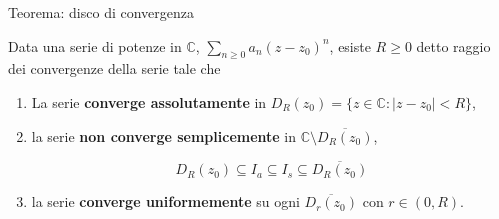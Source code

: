 \documentclass[x11names]{article}
\newcommand{\teorema}[2]{
	\begin{center}
		\fboxsep11pt
		\colorbox{myred}{\begin{minipage}{5.75in}
				\begin{redes}{#1}
					#2
				\end{redes}
		\end{minipage}}
	\end{center}
}
\begin{document}
\teorema{Teorema: disco di convergenza}{
Data una serie di potenze in \(\mathbb{C}\), \(\sum_{n\geq 0} a_{n}(z- z_{0})^n\), esiste \(R\geq 0\) detto raggio dei convergenze della serie tale che
\begin{enumerate}
	\item La serie \textbf{converge assolutamente} in \(D_{R}(z_{0}) = \{z\in \mathbb{C} : |z-z_{0}| < R\}\),
	\item la serie \textbf{non converge semplicemente} in \(\mathbb{C} \setminus \overline{D_{R}(z_{0})}\),
	
	\[ 
	D_{R}(z_{0}) \subseteq I_{a} \subseteq I_{s} \subseteq \overline{D_{R}(z_{0})}
	\]
	
	\item la serie \textbf{converge uniformemente} su ogni \(\overline{D_{r}(z_{0})}\) con \(r \in (0,R)\).
\end{enumerate}
}
\end{document}
